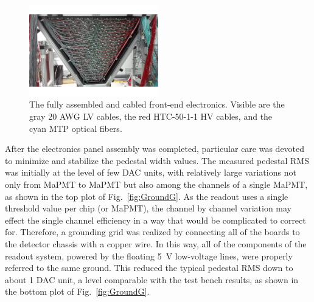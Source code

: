 \documentclass[5p,times,twocolumn]{elsarticle}
\begin{document}
\begin{figure}
\begin{center}
\includegraphics[width=0.50\textwidth]{electronics.pdf}
\caption{The fully assembled and cabled front-end electronics. Visible are the gray 20 AWG LV cables, the red
  HTC-50-1-1 HV cables, and the cyan MTP optical fibers.}
\label{fig:electronics}
\end{center}
\end{figure}

After the electronics panel assembly was completed, particular care was devoted to minimize and stabilize the
pedestal width values. The measured pedestal RMS was initially at the level of few DAC units, with relatively large
variations not only from MaPMT to MaPMT but also among the channels of a single MaPMT, as shown in the top
plot of Fig.~\ref{fig:GroundG}. As the readout uses a single threshold value per chip (or MaPMT), the channel by
channel variation may effect the single channel efficiency in a way that  would be complicated to correct for.
Therefore, a grounding grid was realized by connecting all of the boards to the detector chassis with a copper wire.
In this way, all of the components of the readout system, powered by the floating 5~V low-voltage lines, were properly
referred to the same ground. This reduced the typical pedestal RMS down to about 1 DAC unit, a level comparable
with the test bench results, as shown in the bottom plot of Fig.~\ref{fig:GroundG}.
\end{document}
